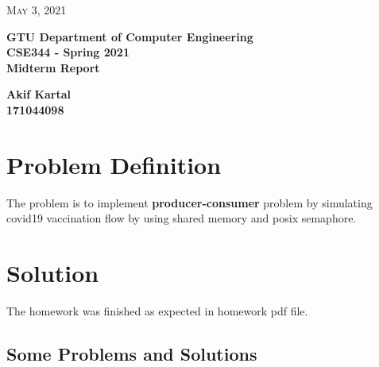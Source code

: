 \documentclass{article}
\begin{document}
\begin{titlepage}

	\begin{flushright}
	\textsc{\large May 3, 2021} \\
	\end{flushright}
	\begin{center}
	\Large{\bfseries GTU Department of Computer Engineering \\ CSE344 - Spring 2021 \\ Midterm Report  } \\
	\end{center}
	\vspace*{\fill}
	\begin{center}
	\Large{\bfseries Akif Kartal \\ 171044098 }
	\end{center}
	\vspace*{\fill}

\end{titlepage}

\cleardoublepage
\section{Problem Definition}
The problem is to implement \textbf{producer-consumer} problem by simulating covid19
vaccination flow by using shared memory and posix semaphore. 

\section{Solution}
The homework was finished as expected in homework pdf file. 
\subsection{Some Problems and Solutions}
\end{document}
